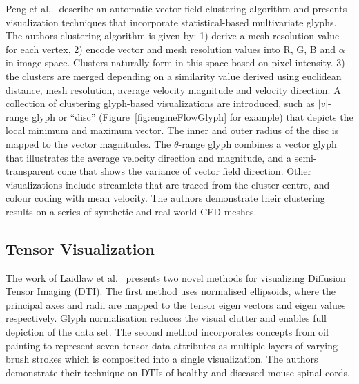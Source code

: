 Peng et al.~\cite{peng12meshDriven} describe an automatic vector field clustering algorithm and presents visualization techniques that incorporate statistical-based multivariate glyphs. The authors clustering algorithm is given by: 1) derive a mesh resolution value for each vertex, 2) encode vector and mesh resolution values into R, G, B and $\alpha$ in image space. Clusters naturally form in this space based on pixel intensity. 3) the clusters are merged depending on a similarity value derived using euclidean distance, mesh resolution, average velocity magnitude and velocity direction. A collection of clustering glyph-based visualizations are introduced, such as $|v|$-range glyph or ``disc'' (Figure~\ref{fig:engineFlowGlyph} for example) that depicts the local minimum and maximum vector. The inner and outer radius of the disc is mapped to the vector magnitudes. The $\theta$-range glyph combines a vector glyph that illustrates the average velocity direction and magnitude, and a semi-transparent cone that shows the variance of vector field direction. Other visualizations include streamlets that are traced from the cluster centre, and colour coding with mean velocity. The authors demonstrate their clustering results on a series of synthetic and real-world CFD meshes. 

\subsection{Tensor Visualization}


The work of Laidlaw et al.~\cite{laidlaw98} presents two novel methods for visualizing Diffusion Tensor Imaging (DTI).
The first method uses normalised ellipsoids, where the principal axes and radii are mapped to the tensor eigen vectors and eigen values respectively.
Glyph normalisation reduces the visual clutter and enables full depiction of the data set.
The second method incorporates concepts from oil painting to represent seven tensor data attributes as multiple layers of varying brush strokes which is composited into a single visualization. The authors demonstrate their technique on DTIs of healthy and diseased mouse spinal cords.

